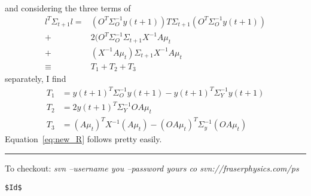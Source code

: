 \documentclass[12pt]{article}
\newcommand{\ti}[2]{{#1}{(#2)}}                         %
\begin{document}
and considering the three terms of
\begin{align*}
  l^T \Sigma_{t+1} l = & (O^T\Sigma_O^{-1} \ti{y}{t+1})T \Sigma_{t+1}
  (O^T\Sigma_O^{-1} \ti{y}{t+1}) \\
  + & 2(O^T\Sigma_O^{-1} \Sigma_{t+1} X^{-1}A\mu_t \\
  + & (X^{-1}A\mu_t)\Sigma_{t+1} X^{-1}A\mu_t \\
  \equiv & T_1+T_2+T_3
\end{align*}
separately, I find
\begin{align*}
  T_1 &= \ti{y}{t+1}^T \Sigma_O^{-1} \ti{y}{t+1} - \ti{y}{t+1}^T
  \Sigma_Y^{-1} \ti{y}{t+1} \\
  T_2 &= 2 \ti{y}{t+1}^T \Sigma_Y^{-1} OA\mu_t \\
  T_3 &= (A\mu_t)^T X^{-1} (A\mu_t) - (OA\mu_t)^T
  \Sigma_y^{-1}(OA\mu_t)
\end{align*}
Equation~\eqref{eq:new_R} follows pretty easily.

\vfill \hrule To checkout: \emph{ svn --username you --password yours
  co svn://fraserphysics.com/ps}
\begin{verbatim}
$Id$
\end{verbatim}
\end{document}
